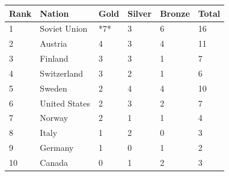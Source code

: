 \documentclass{article}
\begin{document}
\begin{tabular}{llllll}
\toprule
Rank & Nation & Gold & Silver & Bronze & Total \\
\midrule
1 & Soviet Union & *7* & 3 & 6 & 16 \\
2 & Austria & 4 & 3 & 4 & 11 \\
3 & Finland & 3 & 3 & 1 & 7 \\
4 & Switzerland & 3 & 2 & 1 & 6 \\
5 & Sweden & 2 & 4 & 4 & 10 \\
6 & United States & 2 & 3 & 2 & 7 \\
7 & Norway & 2 & 1 & 1 & 4 \\
8 & Italy & 1 & 2 & 0 & 3 \\
9 & Germany & 1 & 0 & 1 & 2 \\
10 & Canada & 0 & 1 & 2 & 3 \\
\bottomrule
\end{tabular}
\end{document}
